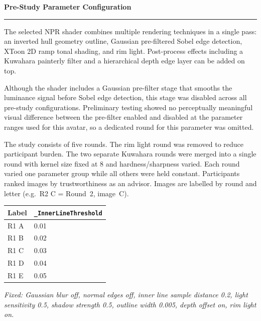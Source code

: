 \documentclass[11pt,a4paper]{article}
\begin{document}
\begin{center}
  {\Large\bfseries\color{uniblue} Pre-Study Parameter Configuration}\\[4pt]

\end{center}

\medskip
\noindent\rule{\linewidth}{0.4pt}
\medskip

The selected NPR shader combines multiple rendering techniques in a single pass: an inverted hull geometry outline, Gaussian pre-filtered Sobel edge detection, XToon 2D ramp tonal shading, and rim light. Post-process effects including a Kuwahara painterly filter and a hierarchical depth edge layer can be added on top.

Although the shader includes a Gaussian pre-filter stage that smooths the luminance signal before Sobel edge detection, this stage was disabled across all pre-study configurations. Preliminary testing showed no perceptually meaningful visual difference between the pre-filter enabled and disabled at the parameter ranges used for this avatar, so a dedicated round for this parameter was omitted.

The study consists of five rounds. The rim light round was removed to reduce participant burden. The two separate Kuwahara rounds were merged into a single round with kernel size fixed at 8 and hardness/sharpness varied. Each round varied one parameter group while all others were held constant. Participants ranked images by trustworthiness as an advisor. Images are labelled by round and letter (e.g.\ R2 C = Round~2, image~C).

\bigskip


\smallskip
\begin{tabular}{ll}
\toprule
\textbf{Label} & \textbf{\texttt{\_InnerLineThreshold}} \\
\midrule
R1 A & 0.01 \\
R1 B & 0.02 \\
R1 C & 0.03 \\
R1 D & 0.04 \\
R1 E & 0.05 \\
\bottomrule
\end{tabular}

\smallskip
\noindent\textit{Fixed: Gaussian blur off, normal edges off, inner line sample distance 0.2, light sensitivity 0.5, shadow strength 0.5, outline width 0.005, depth offset on, rim light on.}
\end{document}
